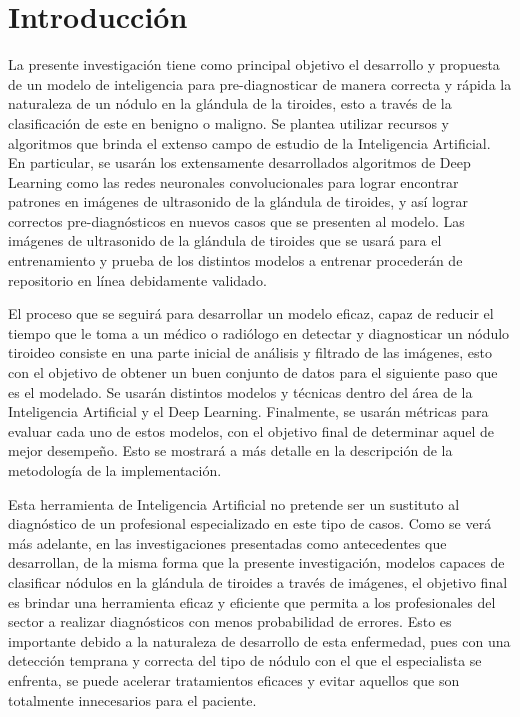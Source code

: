 
\chapter*{Introducción}
La presente investigación tiene como principal objetivo el desarrollo y propuesta de un modelo de inteligencia para pre-diagnosticar de manera correcta y rápida la naturaleza de un nódulo en la glándula de la tiroides, esto a través de la clasificación de este en benigno o maligno. Se plantea utilizar recursos y algoritmos que brinda el extenso campo de estudio de la Inteligencia Artificial. En particular, se usarán los extensamente desarrollados algoritmos de Deep Learning como las redes neuronales convolucionales para lograr encontrar patrones en imágenes de ultrasonido de la glándula de tiroides, y así lograr correctos pre-diagnósticos en nuevos casos que se presenten al modelo. Las imágenes de ultrasonido de la glándula de tiroides que se usará para el entrenamiento y prueba de los distintos modelos a entrenar procederán de repositorio en línea debidamente validado.	

El proceso que se seguirá para desarrollar un modelo eficaz, capaz de reducir el tiempo que le toma a un médico o radiólogo en detectar y diagnosticar un nódulo tiroideo consiste en una parte inicial de análisis y filtrado de las imágenes, esto con el objetivo de obtener un buen conjunto de datos para el siguiente paso que es el modelado. Se usarán distintos modelos y técnicas dentro del área de la Inteligencia Artificial y el Deep Learning. Finalmente, se usarán métricas para evaluar cada uno de estos modelos, con el objetivo final de determinar aquel de mejor desempeño. Esto se mostrará a más detalle en la descripción de la metodología de la implementación.

Esta herramienta de Inteligencia Artificial no pretende ser un sustituto al diagnóstico de un profesional especializado en este tipo de casos. Como se verá más adelante, en las investigaciones presentadas como antecedentes que desarrollan, de la misma forma que la presente investigación, modelos capaces de clasificar nódulos en la glándula de tiroides a través de imágenes, el objetivo final es brindar una herramienta eficaz y eficiente que permita a los profesionales del sector a realizar diagnósticos con menos probabilidad de errores. Esto es importante debido a la naturaleza de desarrollo de esta enfermedad, pues con una detección temprana y correcta del tipo de nódulo con el que el especialista se enfrenta, se puede acelerar tratamientos eficaces y evitar aquellos que son totalmente innecesarios para el paciente.

